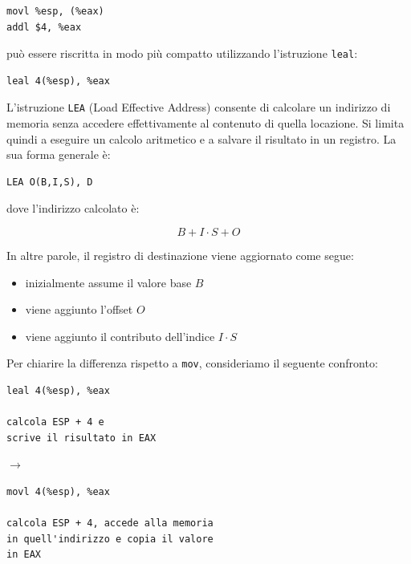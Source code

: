 \begin{verbatim}
movl %esp, (%eax)
addl $4, %eax  
\end{verbatim}
\noindent può essere riscritta in modo più compatto utilizzando l'istruzione \texttt{leal}:
\begin{verbatim}
leal 4(%esp), %eax
\end{verbatim}
\noindent L'istruzione \texttt{LEA} (Load Effective Address) consente di calcolare un indirizzo di memoria senza accedere effettivamente al contenuto di quella locazione. Si limita quindi a eseguire un calcolo aritmetico e a salvare il risultato in un registro. La sua forma generale è:
\begin{verbatim}
LEA O(B,I,S), D
\end{verbatim}
\noindent dove l'indirizzo calcolato è:

\[
B + I \cdot S + O
\]

\noindent In altre parole, il registro di destinazione viene aggiornato come segue:
\begin{itemize}
    \item inizialmente assume il valore base \(B\)
    \item viene aggiunto l'offset \(O\)
    \item viene aggiunto il contributo dell'indice \(I \cdot S\)
\end{itemize}

\noindent Per chiarire la differenza rispetto a \texttt{mov}, consideriamo il seguente confronto:

\medskip

\begin{minipage}{0.45\textwidth}
\begin{verbatim}
leal 4(%esp), %eax

calcola ESP + 4 e
scrive il risultato in EAX
\end{verbatim}
\end{minipage}
\hfill
$\longrightarrow$
\hfill
\begin{minipage}{0.45\textwidth}
\begin{verbatim}
movl 4(%esp), %eax

calcola ESP + 4, accede alla memoria
in quell'indirizzo e copia il valore
in EAX
\end{verbatim}
\end{minipage}

